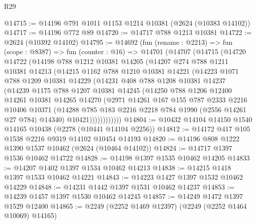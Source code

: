 \begin{lexlean}{R29}
\begin{coremodule}
@14715 := @14196 @791 @1011 @1153 @1214 @10381 (@2624 (@10383 @14102))
@14717 := @14196 @772 @89
@14720 := @14717 @788 @1213 @10381
@14722 := @2624 (@10392 @14102)
@14795 := @14692
    (fun (rename : @2213) =>
    fun (scope : @8387) =>
    fun (counter : @16) =>
    @14701
      (@14707
        (@14715
          (@14720
            @14722
            (@14198
              @788
              @1212
              @10381
              @14205
              (@14207
                @274
                @788
                @1211
                @10381
                @14213
                (@14215
                  @1162
                  @788
                  @1210
                  @10381
                  @14221
                  (@14223
                    @1071
                    @788
                    @1209
                    @10381
                    @14229
                    (@14231
                      @408
                      @788
                      @1208
                      @10381
                      @14237
                      (@14239
                        @1175
                        @788
                        @1207
                        @10381
                        @14245
                        (@14250
                          @788
                          @1206
                          @12400
                          @14261
                          @10381
                          @14265
                          @14270
                          (@2971
                            @14261
                            @167
                            @155
                            @787
                            @2333
                            @2216
                            @10406
                            @10371
                            (@14288 @785 @183 @2216 @2218 @784 @1990 (@2556 @14261 @27 @784) @14340)
                            @10421))))))))))))
@14804 := @10432 @14104 @14150 @1540 @14165 @10438 (@2278 (@10441 @14104 @2256))
@14812 := @14172 @417 @105 @1538 @2216 @9319 @14102 @10454 @14193
@14820 := @14196 @808 @1222 @1390 @1537 @10462 (@2624 (@10464 @14102))
@14824 := @14717 @1397 @1536 @10462 @14722
@14828 := @14198 @1397 @1535 @10462 @14205
@14833 := @14207 @1402 @1397 @1534 @10462 @14213
@14838 := @14215 @1418 @1397 @1533 @10462 @14221
@14843 := @14223 @1427 @1397 @1532 @10462 @14229
@14848 := @14231 @1442 @1397 @1531 @10462 @14237
@14853 := @14239 @1457 @1397 @1530 @10462 @14245
@14857 := @14249 @1472 @1397 @1529 @12400
@14865 := @2249 (@2252 @1469 @12397) (@2249 (@2252 @1464 @10069) @14165)

\end{coremodule}
\end{lexlean}
